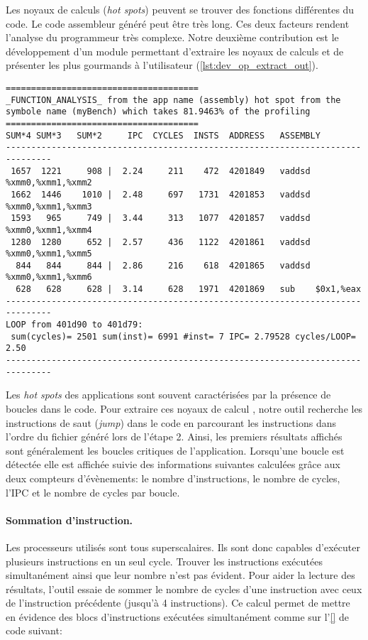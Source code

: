         Les noyaux de calculs (\textit{hot spots}) peuvent se trouver des fonctions différentes du code. Le code assembleur généré peut être très long. Ces deux facteurs rendent l'analyse du programmeur très complexe. Notre deuxième contribution est le développement d'un module permettant d'extraire les noyaux de calculs et de présenter les plus gourmands à l'utilisateur (\autoref{lst:dev_op_extract_out}).
      
\begin{lstlisting}[label=lst:dev_op_extract_out, caption=L'outil Oprofile++ permet de faire correspondre les adresses mémoires des deux fichiers.]
======================================
_FUNCTION_ANALYSIS_ from the app name (assembly) hot spot from the symbole name (myBench) which takes 81.9463% of the profiling
======================================
SUM*4 SUM*3   SUM*2     IPC  CYCLES  INSTS  ADDRESS   ASSEMBLY  
-------------------------------------------------------------------------------
 1657  1221     908 |  2.24     211    472  4201849   vaddsd %xmm0,%xmm1,%xmm2
 1662  1446    1010 |  2.48     697   1731  4201853   vaddsd %xmm0,%xmm1,%xmm3
 1593   965     749 |  3.44     313   1077  4201857   vaddsd %xmm0,%xmm1,%xmm4
 1280  1280     652 |  2.57     436   1122  4201861   vaddsd %xmm0,%xmm1,%xmm5
  844   844     844 |  2.86     216    618  4201865   vaddsd %xmm0,%xmm1,%xmm6
  628   628     628 |  3.14     628   1971  4201869   sub    $0x1,%eax
-------------------------------------------------------------------------------
LOOP from 401d90 to 401d79:
 sum(cycles)= 2501 sum(inst)= 6991 #inst= 7 IPC= 2.79528 cycles/LOOP= 2.50
-------------------------------------------------------------------------------
\end{lstlisting} 

        Les \textit{hot spots} des applications sont souvent caractérisées par la présence de boucles dans le code. Pour extraire ces noyaux de calcul , notre outil recherche les instructions de saut (\textit{jump}) dans le code en parcourant les instructions dans l'ordre du fichier généré lors de l'étape 2. Ainsi, les premiers résultats affichés sont généralement les boucles critiques de l'application. Lorsqu'une boucle est détectée elle est affichée suivie des informations suivantes calculées grâce aux deux compteurs d'évènements: le nombre d'instructions, le nombre de cycles, l'IPC et le nombre de cycles par boucle. 
        
        \paragraph{Sommation d'instruction.} Les processeurs utilisés sont tous superscalaires. Ils sont donc capables d'exécuter plusieurs instructions en un seul cycle. Trouver les instructions exécutées simultanément ainsi que leur nombre n'est pas évident. Pour aider la lecture des résultats, l'outil essaie de sommer le nombre de cycles d'une instruction avec ceux de l'instruction précédente (jusqu'à 4 instructions). Ce calcul permet de mettre en évidence des blocs d'instructions exécutées simultanément comme sur l'\autoref{} de code suivant:
        
